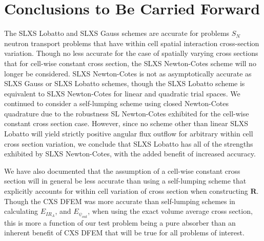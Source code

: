 \section{Conclusions to Be Carried Forward}
The SLXS Lobatto and SLXS Gauss schemes are accurate for problems $S_N$ neutron transport problems that have within cell spatial interaction cross-section variation.
Though no less accurate for the case of spatially varying cross sections that for cell-wise constant cross section, the SLXS Newton-Cotes scheme will no longer be considered.
SLXS Newton-Cotes is not as asymptotically accurate as SLXS Gauss or SLXS Lobatto schemes, though the SLXS Lobatto scheme is equivalent to SLXS Newton-Cotes for linear and quadratic trial spaces.
We continued to consider a self-lumping scheme using closed Newton-Cotes quadrature due to the robustness SL Newton-Cotes exhibited for the cell-wise constant cross section case.
However, since no scheme other than linear SLXS Lobatto will yield strictly positive angular flux outflow for arbitrary within cell cross section variation, we conclude that SLXS Lobatto has all of the strengths exhibited by SLXS Newton-Cotes, with the added benefit of increased accuracy.

We have also documented that the assumption of a cell-wise constant cross section will in general be less accurate than using a self-lumping scheme that explicitly accounts for within cell variation of cross section when constructing $\mathbf{R}$.
Though the CXS DFEM was more accurate than self-lumping schemes in calculating $E_{IR_A}$, and $E_{\psi_{out}}$, when using the exact volume average cross section, this is more a function of our test problem being a pure absorber than an inherent benefit of CXS DFEM that will be true for all problems of interest. 
